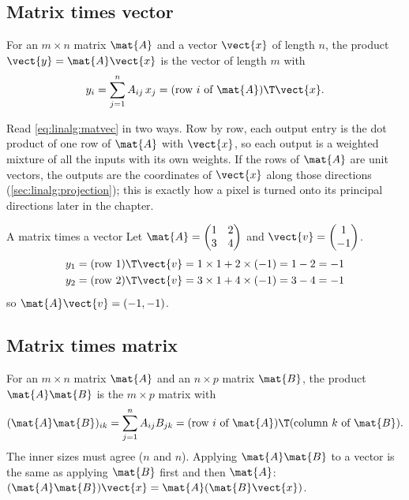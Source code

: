\subsection{Matrix times vector}

\begin{definition}
For an $m \times n$ matrix $\mat{A}$ and a vector $\vect{x}$ of length $n$, the product
$\vect{y} = \mat{A}\vect{x}$ is the vector of length $m$ with
\begin{equation}\label{eq:linalg:matvec}
y_i = \sum_{j=1}^{n} A_{ij}\,x_j = (\text{row $i$ of } \mat{A})\T\vect{x}.
\end{equation}
\end{definition}

Read \cref{eq:linalg:matvec} in two ways. Row by row, each output entry is the dot product of
one row of $\mat{A}$ with $\vect{x}$, so each output is a weighted mixture of all the inputs with
its own weights. If the rows of $\mat{A}$ are unit vectors, the outputs are the coordinates of
$\vect{x}$ along those directions (\cref{sec:linalg:projection}); this is exactly how a
pixel is turned onto its principal directions later in the chapter.

\begin{worked}[label={we:linalg:matvec}]{A matrix times a vector}
Let
$\mat{A} = \begin{pmatrix} 1 & 2 \\ 3 & 4 \end{pmatrix}$ and
$\vect{v} = \begin{pmatrix} 1 \\ -1 \end{pmatrix}$.
\begin{align*}
y_1 &= (\text{row 1})\T\vect{v} = 1\times1 + 2\times(-1) = 1 - 2 = -1\\
y_2 &= (\text{row 2})\T\vect{v} = 3\times1 + 4\times(-1) = 3 - 4 = -1
\end{align*}
so $\mat{A}\vect{v} = (-1, -1)$.
\end{worked}

\subsection{Matrix times matrix}

\begin{definition}
For an $m \times n$ matrix $\mat{A}$ and an $n \times p$ matrix $\mat{B}$, the product
$\mat{A}\mat{B}$ is the $m \times p$ matrix with
\[
(\mat{A}\mat{B})_{ik} = \sum_{j=1}^{n} A_{ij} B_{jk}
= (\text{row $i$ of } \mat{A})\T(\text{column $k$ of } \mat{B}).
\]
The inner sizes must agree ($n$ and $n$). Applying $\mat{A}\mat{B}$ to a vector is the same as
applying $\mat{B}$ first and then $\mat{A}$: $(\mat{A}\mat{B})\vect{x} = \mat{A}(\mat{B}\vect{x})$.
\end{definition}

